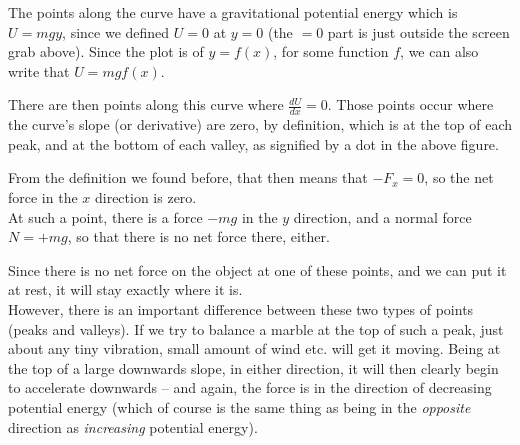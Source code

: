 \begin{figure}[H]
  \centering
{}
\end{figure}



The points along the curve have a gravitational potential energy which is $U = m g y$, since we defined $U = 0$ at $y = 0$ (the $= 0$ part is just outside the screen grab above). Since the plot is of $y = f(x)$, for some function $f$, we can also write that $U = m g f(x)$.

There are then points along this curve where $\displaystyle \frac{dU}{dx} = 0$. Those points occur where the curve's slope (or derivative) are zero, by definition, which is at the top of each peak, and at the bottom of each valley, as signified by a dot in the above figure.

From the definition we found before, that then means that $-F_x = 0$, so the net force in the $x$ direction is zero.\\
At such a point, there is a force $-m g$ in the $y$ direction, and a normal force $N = + m g$, so that there is no net force there, either.

Since there is no net force on the object at one of these points, and we can put it at rest, it will stay exactly where it is.\\
However, there is an important difference between these two types of points  (peaks and valleys). If we try to balance a marble at the top of such a peak, just about any tiny vibration, small amount of wind etc. will get it moving. Being at the top of a large downwards slope, in either direction, it will then clearly begin to accelerate downwards -- and again, the force is in the direction of decreasing potential energy (which of course is the same thing as being in the \emph{opposite} direction as \emph{increasing} potential energy).

